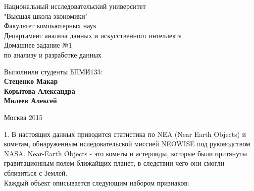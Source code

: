 \documentclass{article}
\begin{document}
\begin{titlepage}  

\begin{center}  

\large Национальный исследовательский университет \\"Высшая школа экономики"\\[0.5cm]

\large Факультет компьютерных наук\\

\large Департамент анализа данных и искусственного интеллекта\\[4cm]

\huge Домашнее задание №1\\
\large по анализу и разработке данных\\[4cm]

\end{center}

\begin{flushleft}
\large Выполнили студенты БПМИ133:\\
\large \bf{Стеценко Макар}\\
\large \bf{Корытова Александра}\\
\large \bf{Милеев Алексей}\\[5cm]
\end{flushleft}

\begin{center}
\large Москва 2015
\end{center}

\end{titlepage}

\newpage

1. В настоящих данных приводится статистика по NEA (Near Earth Objects) и кометам, обнаруженным иследовательской миссией NEOWISE под руководством NASA. Near-Earth Objects - это кометы и астероиды, которые были притянуты гравитационным полем ближайщих планет, в следствии чего они смогли сблизиться с Землей. \\[0.3cm]



Каждый объект описывается следующим набором признаков:
\end{document}
